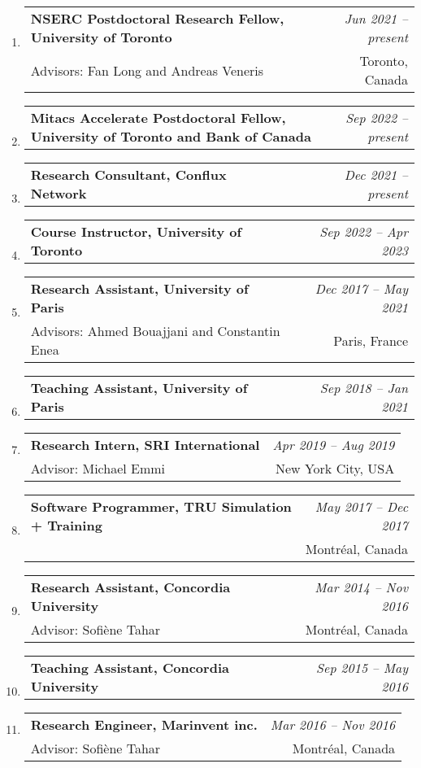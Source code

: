 \documentclass[10pt]{article}
\makeatletter
\newcommand{\lbar}[1]{{\color{#1}\ding{118}}\hspace*{2pt}}
\newenvironment{benumerate}[2]{
    \let\oldItem\item
    \def\item{\addtocounter{enumi}{-2}\oldItem}
    \begin{enumerate}[#2] \itemsep3pt
    \setcounter{enumi}{#1}
    \addtocounter{enumi}{1}}
  {\end{enumerate}}
\newcommand{\positionnodesc}[2]
{%
\item
  \begin{tabular*}{7.5in}{l@{\extracolsep{\fill}}r}
    \textbf{#1} & \textit{#2}
  \end{tabular*}
}
\newenvironment{position}[4]
{%
\item
  \begin{tabular*}{7.5in}{l@{\extracolsep{\fill}}r}
    \textbf{#1} & \textit{#2} \\
    \hspace{1ex} #3 & \small{#4} \\
  \end{tabular*}
  }
  { %
}
\newenvironment{region}[3]{%
  \vspace*{0.5ex}
  {\scalebox{1.4}{\textbf{#1}}}
  \begin{benumerate}{#3}{\color{RoyalBlue}#2}}
  {\end{benumerate}\vspace{0.8ex}}
\newenvironment{nonumregion}[1]{%
\begin{region}{#1}{}{1}}
{\end{region}}
\makeatother
\begin{document}
\begin{nonumregion} {\lbar{orange}Experience}
  \begin{position}{NSERC Postdoctoral Research Fellow, University of Toronto}{Jun 2021 -- present}
		{Advisors: Fan Long and Andreas Veneris}{Toronto, Canada}
  \end{position}
  \positionnodesc{Mitacs Accelerate Postdoctoral Fellow, University of Toronto and Bank of Canada}{Sep 2022 -- present}
  \positionnodesc{Research Consultant, Conflux Network}{Dec 2021 -- present}
  \positionnodesc{Course Instructor, University of Toronto}{Sep 2022 -- Apr 2023}
  \begin{position}{Research Assistant, University of Paris}{Dec 2017 -- May 2021}
		{Advisors: Ahmed Bouajjani and Constantin Enea}{Paris, France}
  \end{position}
  \positionnodesc{Teaching Assistant, University of Paris}{Sep 2018 -- Jan 2021}
  \begin{position}{Research Intern, SRI International}{Apr 2019 -- Aug 2019}
		{Advisor: Michael Emmi}{New York City, USA}
  \end{position}
  \begin{position}{Software Programmer, TRU Simulation + Training}{May 2017 -- Dec 2017}
      {}{Montr\'{e}al, Canada}
  \end{position}
  \begin{position}{Research Assistant, Concordia University}{Mar 2014 -- Nov 2016}
		{Advisor: Sofi\`{e}ne Tahar}{Montr\'{e}al, Canada}
  \end{position}
  \positionnodesc{Teaching Assistant, Concordia University}{Sep 2015 -- May 2016}
  \begin{position}{Research Engineer, Marinvent inc.}{Mar 2016 -- Nov 2016}
		{Advisor: Sofi\`{e}ne Tahar}{Montr\'{e}al, Canada}
  \end{position}
  

\end{nonumregion}
\end{document}
